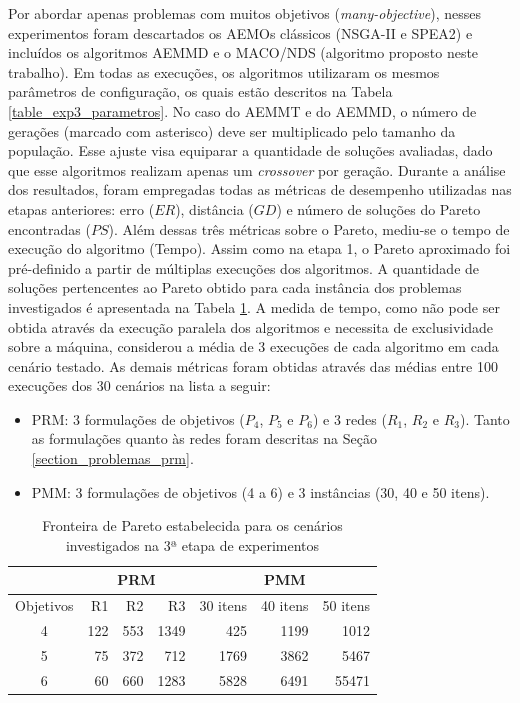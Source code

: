 Por abordar apenas problemas com muitos objetivos (\textit{many-objective}), nesses experimentos foram descartados os AEMOs clássicos (NSGA-II e SPEA2) e incluídos os algoritmos AEMMD e o MACO/NDS (algoritmo proposto neste trabalho). Em todas as execuções, os algoritmos utilizaram os mesmos parâmetros de configuração, os quais estão descritos na Tabela \ref{table_exp3_parametros}. No caso do AEMMT e do AEMMD, o número de gerações (marcado com asterisco) deve ser multiplicado pelo tamanho da população. Esse ajuste visa equiparar a quantidade de soluções avaliadas, dado que esse algoritmos realizam apenas um \textit{crossover} por geração. Durante a análise dos resultados, foram empregadas todas as métricas de desempenho utilizadas nas etapas anteriores: erro ($ER$),  distância ($GD$) e número de soluções do Pareto encontradas ($PS$). Além dessas três métricas sobre o Pareto, mediu-se o tempo de execução do algoritmo (Tempo). Assim como na etapa 1, o Pareto aproximado foi pré-definido a partir de múltiplas execuções dos algoritmos. A quantidade de soluções pertencentes ao Pareto obtido para cada instância dos problemas investigados é apresentada na Tabela \ref{table_exp3_paretos}. A medida de tempo, como não pode ser obtida através da execução paralela dos algoritmos e necessita de exclusividade sobre a máquina, considerou a média de 3 execuções de cada algoritmo em cada cenário testado. As demais métricas foram obtidas através das médias entre 100 execuções dos 30 cenários na lista a seguir:

\begin{itemize}
	\item PRM: 3 formulações de objetivos ($P_4$, $P_5$ e $P_6$) e 3 redes ($R_1$, $R_2$ e $R_3$). Tanto as formulações quanto às redes foram descritas na Seção \ref{section_problemas_prm}.
	\item PMM: 3 formulações de objetivos (4 a 6) e 3 instâncias (30, 40 e 50 itens).
\end{itemize}


\begin{table}[!htbp]
	\centering
	\caption{Fronteira de Pareto estabelecida para os cenários investigados na 3ª etapa de experimentos}
	\label{table_exp3_paretos}
	\begin{tabular}{c|rrr|rrr}
		& \multicolumn{3}{c|}{\textbf{PRM}} & \multicolumn{3}{c}{\textbf{PMM}} \\ \hline
		Objetivos & R1         & R2       & R3        & 30 itens  & 40 itens & 50 itens \\ \hline
		4         & 122        & 553       & 1349        & 425       & 1199      & 1012    \\
		5         & 75        & 372      & 712       & 1769      & 3862     & 5467   \\
		6         & 60       & 660      & 1283      & 5828      & 6491   & 55471   \\ \hline
	\end{tabular}
\end{table}

